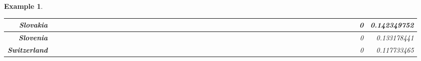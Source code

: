 \documentclass[a4paper,11pt]{report}
\newtheorem{example}[theorem]{Example}
\begin{document}
\begin{example}
\begin{appendices}
\begin{landscape}
\begin{longtable}{r|r|r|r|r|r|r|r|r|r|r|r|r|r|r|r|r|r|r|r|r|r|r|r|r|r|r|r|r|r|r|r|r|r|r|r|r|r|r|r|r|r|r|r|r|r|r|}
\multicolumn{1}{|r|}{\textbf{Slovakia}}              &                  &                  &                  &                     &                  &                  &                                &                   &                  &                 &                         &                  &                  &                           &                  &                 &                  &                 &                  &                  &                  &                 &                 &                    &                &                  &                     &                 &                 &                   &                  &                 &                 &                   &                   &                &                 &                      &                          &                 &                  &                         &                 &                & 0                        & 0.142349752        \\ \hline
\multicolumn{1}{|r|}{\textbf{Slovenia}}              &                  &                  &                  &                     &                  &                  &                                &                   &                  &                 &                         &                  &                  &                           &                  &                 &                  &                 &                  &                  &                  &                 &                 &                    &                &                  &                     &                 &                 &                   &                  &                 &                 &                   &                   &                &                 &                      &                          &                 &                  &                         &                 &                & 0                        & 0.133178441        \\ \hline
\multicolumn{1}{|r|}{\textbf{Switzerland}}           &                  &                  &                  &                     &                  &                  &                                &                   &                  &                 &                         &                  &                  &                           &                  &                 &                  &                 &                  &                  &                  &                 &                 &                    &                &                  &                     &                 &                 &                   &                  &                 &                 &                   &                   &                &                 &                      &                          &                 &                  &                         &                 &                & 0                        & 0.117733465        \\ \hline

\end{longtable}
\end{landscape}
\end{appendices}
\end{example}
\end{document}
